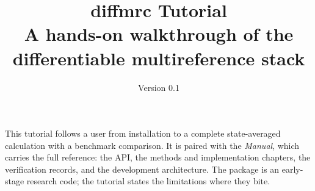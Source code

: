 \documentclass[11pt]{article}
\title{\textbf{diffmrc Tutorial}\\[4pt]
  \large A hands-on walkthrough of the differentiable multireference stack}
\author{}
\date{Version 0.1}
\begin{document}
\maketitle
\begin{center}
\begin{minipage}{0.85\textwidth}
\small
This tutorial follows a user from installation to a complete
state-averaged calculation with a benchmark comparison.  It is paired
with the \emph{Manual}, which carries the full reference: the API, the
methods and implementation chapters, the verification records, and the
development architecture.  The package is an early-stage research code;
the tutorial states the limitations where they bite.
\end{minipage}
\end{center}
\tableofcontents
\clearpage















\end{document}
